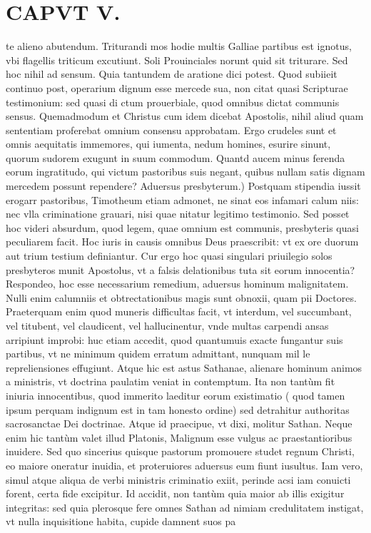 \documentclass{article}
\begin{document}
\begin{pages}
{}
\subsection*{\textit{}}
\section*{CAPVT V. }
\marginpar{[ p.67 ]}\pstart te alieno abutendum. Triturandi mos hodie multis Galliae partibus est ignotus, vbi flagellis triticum excutiunt. Soli Prouinciales norunt quid sit triturare. Sed hoc nihil ad sensum. Quia tantundem de aratione dici potest. Quod subiieit continuo post, operarium dignum esse mercede sua, non citat quasi Scripturae testimonium: sed quasi di ctum prouerbiale, quod omnibus dictat communis sensus. Quemadmodum et Christus cum idem dicebat Apostolis, nihil aliud quam sententiam proferebat omnium consensu approbatam. Ergo crudeles sunt et omnis aequitatis immemores, qui iumenta, nedum homines, esurire sinunt, quorum sudorem exugunt in suum commodum. Quantd aucem minus ferenda eorum ingratitudo, qui victum pastoribus suis negant, quibus nullam satis dignam mercedem possunt rependere?  \pend\pstart Aduersus presbyterum.) Postquam stipendia iussit erogarr pastoribus, Timotheum etiam admonet, ne sinat eos infamari calum niis: nec vlla criminatione grauari, nisi quae nitatur legitimo testimonio. Sed posset hoc videri absurdum, quod legem, quae omnium est communis, presbyteris quasi peculiarem facit. Hoc iuris in causis omnibus Deus praescribit: vt ex ore duorum aut trium testium definiantur. Cur ergo hoc quasi singulari priuilegio solos presbyteros munit Apostolus, vt a falsis delationibus tuta sit eorum innocentia? Respondeo, hoc esse necessarium remedium, aduersus hominum malignitatem. Nulli enim calumniis et obtrectationibus magis sunt obnoxii, quam pii Doctores. Praeterquam enim quod muneris difficultas facit, vt interdum, vel succumbant, vel titubent, vel claudicent, vel hallucinentur, vnde multas carpendi ansas arripiunt improbi: huc etiam accedit, quod quantumuis exacte fungantur suis partibus, vt ne minimum quidem erratum admittant, nunquam mil le repreliensiones effugiunt. Atque hic est astus Sathanae, alienare hominum animos a ministris, vt doctrina paulatim veniat in contemptum. Ita non tantùm fit iniuria innocentibus, quod immerito laeditur eorum existimatio ( quod tamen ipsum perquam indignum est in tam honesto ordine) sed detrahitur authoritas sacrosanctae Dei doctrinae. Atque id praecipue, vt dixi, molitur Sathan. Neque enim hic tantùm valet illud Platonis, Malignum esse vulgus ac praestantioribus inuidere. Sed quo sincerius quisque pastorum promouere studet regnum Christi, eo maiore oneratur inuidia, et proteruiores aduersus eum fiunt iusultus. Iam vero, simul atque aliqua de verbi ministris criminatio exiit, perinde acsi iam conuicti forent, certa fide excipitur. Id accidit, non tantùm quia maior ab illis exigitur integritas: sed quia plerosque fere omnes Sathan ad nimiam credulitatem instigat, vt nulla inquisitione habita, cupide damnent suos pa\pend

\end{pages}
\end{document}
